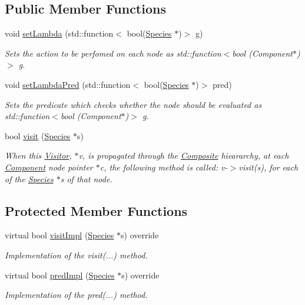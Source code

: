 \subsection*{Public Member Functions}
\begin{DoxyCompactItemize}
\item 
void \hyperlink{classSpeciesVisitorLambda_a09d2fbe0f3aec217fb587b7a4ad26733}{set\+Lambda} (std\+::function$<$ bool(\hyperlink{classSpecies}{Species} $\ast$)$>$ g)
\begin{DoxyCompactList}\small\item\em Sets the action to be perfomed on each node as std\+::function$<$bool (\+Component$\ast$)$>$ g. \end{DoxyCompactList}\item 
void \hyperlink{classSpeciesVisitorLambda_a9e47f21aa9709e39065e8f393ed094c5}{set\+Lambda\+Pred} (std\+::function$<$ bool(\hyperlink{classSpecies}{Species} $\ast$)$>$ pred)
\begin{DoxyCompactList}\small\item\em Sets the predicate which checks whether the node should be evaluated as std\+::function$<$bool (\+Component$\ast$)$>$ g. \end{DoxyCompactList}\item 
bool \hyperlink{classSpeciesVisitor_a1a3573d237d36307cc35e123e67875db}{visit} (\hyperlink{classSpecies}{Species} $\ast$s)
\begin{DoxyCompactList}\small\item\em When this \hyperlink{classVisitor}{Visitor}, $\ast$v, is propagated through the \hyperlink{classComposite}{Composite} hieararchy, at each \hyperlink{classComponent}{Component} node pointer $\ast$c, the following method is called\+: v-\/$>$visit(s), for each of the \hyperlink{classSpecies}{Species} $\ast$s of that node. \end{DoxyCompactList}\end{DoxyCompactItemize}
\subsection*{Protected Member Functions}
\begin{DoxyCompactItemize}
\item 
virtual bool \hyperlink{classSpeciesVisitorLambda_aa98d74ce907a46e8f7ad1ce25d5445fe}{visit\+Impl} (\hyperlink{classSpecies}{Species} $\ast$s) override
\begin{DoxyCompactList}\small\item\em Implementation of the visit(...) method. \end{DoxyCompactList}\item 
virtual bool \hyperlink{classSpeciesVisitorLambda_addaad814d443e92eff749acae08f9e3d}{pred\+Impl} (\hyperlink{classSpecies}{Species} $\ast$s) override
\begin{DoxyCompactList}\small\item\em Implementation of the pred(...) method. \end{DoxyCompactList}\end{DoxyCompactItemize}
